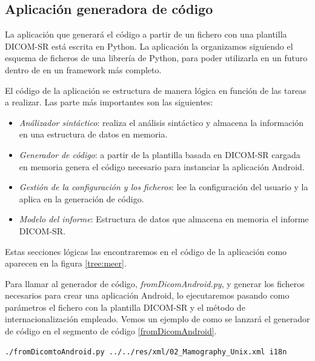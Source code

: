 \subsection{Aplicación generadora de código}
La aplicación que generará el código a partir de un fichero con una plantilla DICOM-SR está escrita en Python. La aplicación la organizamos siguiendo el esquema de ficheros de una librería de Python, para poder utilizarla en un futuro dentro de en un framework más completo. \par
El código de la aplicación se estructura de manera lógica en función de las tareas a realizar. Las parte más importantes son las siguientes:
\begin{itemize}
\item\emph{Análizador sintáctico}: realiza el análisis sintáctico y almacena la información en una estructura de datos en memoria.
\item\emph{Generador de código}: a partir de la plantilla basada en  DICOM-SR cargada en memoria genera el código necesario para instanciar la aplicación Android.
\item\emph{Gestión de la configuración y los ficheros}: lee la configuración del usuario y la aplica en la generación de código.
\item\emph{Modelo del informe}: Estructura de datos que almacena en memoria el informe DICOM-SR.
\end{itemize}
Estas secciones lógicas las encontraremos en el código de la aplicación como aparecen en la figura \ref{tree:meer}.\par
Para llamar al generador de código, \emph{fromDicomAndroid.py}, y generar los ficheros necesarios para crear una aplicación Android, lo ejecutaremos pasando como parámetros el fichero con la plantilla DICOM-SR y el método de internacionalización empleado. Vemos un ejemplo de como se lanzará el generador de código en el segmento de código \ref{fromDicomAndroid}.
\begin{lstlisting}[language=bash,label=fromDicomAndroid,caption=Ejecución del generador de código]
	./fromDicomtoAndroid.py ../../res/xml/02_Mamography_Unix.xml i18n    
\end{lstlisting}



